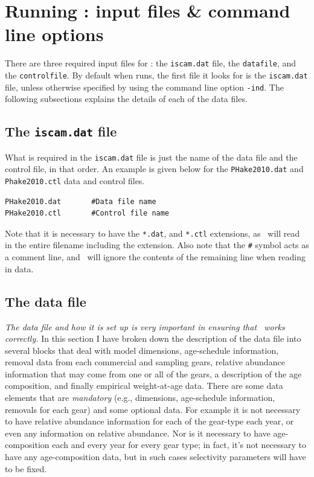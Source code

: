
\section{Running \iscam: input files \& command line options} %
\label{sec:running_iscam_input_files_&_command_line_options}

\begin{multicols}{2}


There are three required input files for \iscam: the \verb"iscam.dat" file, the \verb"datafile", and the \verb"controlfile".  By default when \iscam runs, the first file it looks for is the \verb"iscam.dat" file, unless otherwise specified by using the command line option \verb"-ind".  The following subsections explains the details of each of the data files.


\subsection{The \texttt{iscam.dat} file}
What is required in the \verb"iscam.dat" file is just the name of the data file and the control file, in that order.  An example is given below for the \texttt{PHake2010.dat} and \texttt{Phake2010.ctl} data and control files.
\begin{verbatim}
PHake2010.dat		#Data file name
PHake2010.ctl		#Control file name
\end{verbatim}
Note that it is necessary to have the \verb"*.dat", and \verb"*.ctl" extensions, as \iscam\ will read in the entire filename including the extension.  Also note that the \verb"#" symbol acts as a comment line, and \iscam\ will ignore the contents of the remaining line when reading in data.

\subsection{The data file}
\emph{The data file and how it is set up is very important in ensuring that \iscam\ works correctly.}  In this section I have broken down the description of the data file into several blocks that deal with model dimensions, age-schedule information, removal data from each commercial and sampling gears, relative abundance information that may come from one or all of the gears,  a description of the age composition, and finally empirical weight-at-age data.  There are some data elements that are \emph{mandatory} (e.g., dimensions, age-schedule information, removals for each gear) and some optional data.  For example it is not necessary to have relative abundance information for each of the gear-type each year, or even any information on relative abundance.  Nor is it necessary to have age-composition each and every year for every gear type; in fact, it's not necessary to have any age-composition data, but in such cases selectivity parameters will have to be fixed.



\end{multicols}
